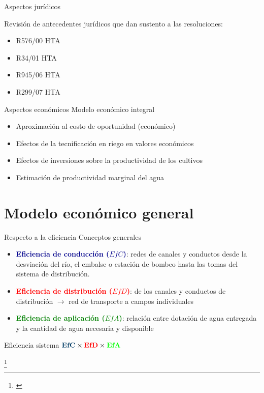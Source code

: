 \documentclass{beamer}\usepackage[]{graphicx}\usepackage[]{color}
\newcommand\blfootnote[1]{%
\begingroup
\renewcommand\thefootnote{}\footnote{#1}%
\addtocounter{footnote}{-1}%
\endgroup
}
\begin{document}
\begin{frame}{Aspectos jurídicos}
\vspace{-2pt}

Revisión de antecedentes jurídicos que dan sustento a las resoluciones:
\begin{itemize}
\item R576/00 HTA
\item R34/01 HTA
\item R945/06 HTA
\item R299/07 HTA
\end{itemize}
\end{frame}


\begin{frame}{Aspectos económicos}
Modelo económico integral
\pause \vspace{2pt}
    \begin{itemize}
      \item Aproximación al costo de oportunidad (económico)
      \item Efectos de la tecnificación en riego en valores económicos
      \item Efectos de inversiones sobre la productividad de los cultivos 
      \item Estimación de productividad marginal del agua
    \end{itemize}

\end{frame}


\section{Modelo económico general}

\begin{frame}{Respecto a la eficiencia}
Conceptos generales

\begin{itemize}
          \item \textcolor{darkblue}{\textbf{Eficiencia de conducción ($EfC$)}}: redes de canales y conductos desde la desviación del río, el embalse o estación de bombeo hasta las tomas del sistema de distribución.
    \pause \item \textcolor{red}{\textbf{Eficiencia de distribución ($EfD$)}}: de los canales y conductos de distribución $\rightarrow$ red de transporte a campos individuales
    \pause \item \textcolor{green}{\textbf{Eficiencia de aplicación ($EfA$)}}: relación entre dotación de agua entregada y la cantidad de agua necesaria y disponible
\end{itemize}

\pause
\begin{block}{Eficiencia sistema}
 $\textcolor{darkblue}{\textbf{EfC}} \times \textcolor{red}{\textbf{EfD}} \times \textcolor{green}{\textbf{EfA}}$
\end{block}
      \blfootnote{\scriptsize \citep{Bos1990,Morabito2005}}
\end{frame}
\end{document}
